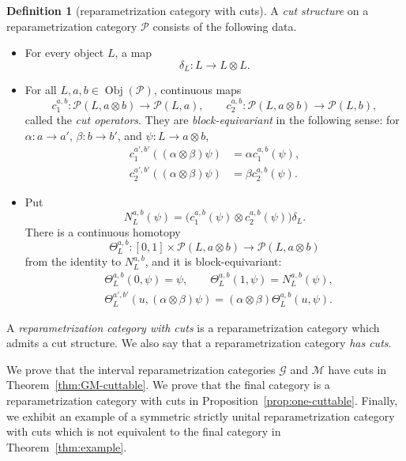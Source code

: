 \documentclass[12pt,a4paper]{amsart}
\newcommand{\Pcat}{\mathcal P}
\newcommand{\G}{\mathcal G}
\newcommand{\M}{\mathcal M}
\newcommand{\Obj}{\operatorname{Obj}}
\theoremstyle{definition}
\newtheorem{definition}[thm]{Definition}
\begin{document}
\begin{definition}[reparametrization category with cuts]
\label{def:cuttable}
A \emph{cut structure} on a reparametrization category \(\Pcat\) consists of the following data.
\begin{itemize}
\item For every object \(L\), a map
\[
 \delta_L: L\longrightarrow L\otimes L.
\]
\item For all \(L,a,b\in\Obj(\Pcat)\), continuous maps
\[
 c^{a,b}_1:\Pcat(L,a\otimes b)\longrightarrow\Pcat(L,a),
 \qquad
 c^{a,b}_2:\Pcat(L,a\otimes b)\longrightarrow\Pcat(L,b),
\]
called the \emph{cut operators}.  They are \textit{block-equivariant} in the following sense: for
\(\alpha: a\to a'\), \(\beta: b\to b'\), and
\(\psi: L\to a\otimes b\),
\begin{align}
 c^{a',b'}_1((\alpha\otimes\beta)\psi)
   &=\alpha c^{a,b}_1(\psi),                         \label{eq:cut-equiv1}\\
 c^{a',b'}_2((\alpha\otimes\beta)\psi)
   &=\beta c^{a,b}_2(\psi).                         \label{eq:cut-equiv2}
\end{align}
\item Put
\begin{equation}\label{eq:normalization}
 N^{a,b}_L(\psi)=
 \bigl(c^{a,b}_1(\psi)\otimes c^{a,b}_2(\psi)\bigr)\delta_L.
\end{equation}
There is a continuous homotopy
\[
 \Theta^{a,b}_L:
 [0,1]\times\Pcat(L,a\otimes b)\longrightarrow\Pcat(L,a\otimes b)
\]
from the identity to \(N^{a,b}_L\), and it is block-equivariant:
\begin{align}
 &\Theta^{a,b}_L(0,\psi)=\psi,\qquad
 \Theta^{a,b}_L(1,\psi)=N^{a,b}_L(\psi),
                                                        \label{eq:Theta-ends}\\
 &\Theta^{a',b'}_L(u,(\alpha\otimes\beta)\psi)
   =(\alpha\otimes\beta)\Theta^{a,b}_L(u,\psi).
                                                        \label{eq:Theta-equiv}
\end{align}
\end{itemize}
A \textit{reparametrization category with cuts} is a reparametrization category which admits a cut structure. We also say that a reparametrization category \textit{has cuts}.
\end{definition}

We prove that the interval reparametrization categories \(\G\) and \(\M\) have cuts in Theorem~\ref{thm:GM-cuttable}. We prove that the final category is a reparametrization category with cuts in Proposition~\ref{prop:one-cuttable}. Finally, we exhibit an example of a symmetric strictly unital reparametrization category with cuts which is not equivalent to the final category in Theorem~\ref{thm:example}.
 
\end{document}
